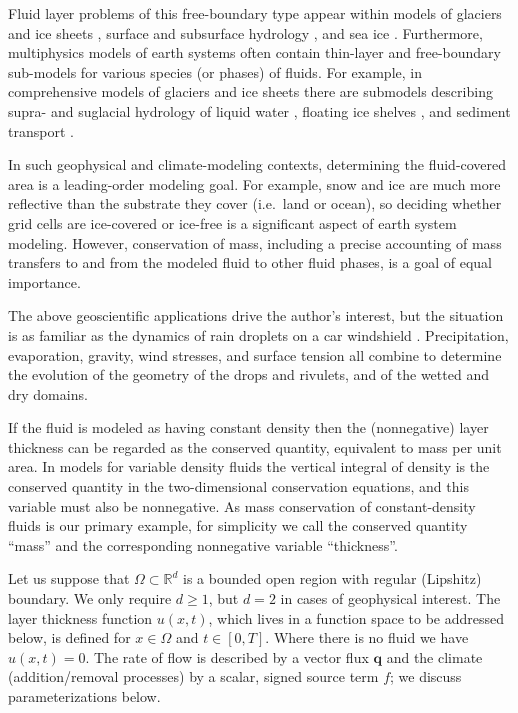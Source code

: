\documentclass[final,onefignum]{siamart190516}
\newcommand\bq{\mathbf{q}}
\newcommand\RR{\mathbb{R}}
\begin{document}
Fluid layer problems of this free-boundary type appear within models of glaciers and ice sheets \cite{Bueler2016,CalvoDuranyVazquez2000,Calvoetal2002,DiazSchiavi1999,EgholmNielsen2010,JouvetBueler2012},  surface and subsurface hydrology \cite{AlonsoSantillanaDawson2008,Maxwelletal2014}, and sea ice \cite{LipscombHunke2004,Thorndikeetal1975}.  Furthermore, multiphysics models of earth systems often contain thin-layer and free-boundary sub-models for various species (or phases) of fluids.  For example, in comprehensive models of glaciers and ice sheets there are submodels describing supra- and suglacial hydrology of liquid water \cite{Aschwandenetal2012,BuelervanPelt2015,Schoofetal2012}, floating ice shelves \cite{Albrechtetal2011}, and sediment transport \cite{Brinkerhoffetal2017}.

In such geophysical and climate-modeling contexts, determining the fluid-covered area is a leading-order modeling goal.  For example, snow and ice are much more reflective than the substrate they cover (i.e.~land or ocean), so deciding whether grid cells are ice-covered or ice-free is a significant aspect of earth system modeling.  However, conservation of mass, including a precise accounting of mass transfers to and from the modeled fluid to other fluid phases, is a goal of equal importance.

The above geoscientific applications drive the author's interest, but the situation is as familiar as the dynamics of rain droplets on a car windshield \cite{Kondic2003}.  Precipitation, evaporation, gravity, wind stresses, and surface tension all combine to determine the evolution of the geometry of the drops and rivulets, and of the wetted and dry domains.

If the fluid is modeled as having constant density then the (nonnegative) layer thickness can be regarded as the conserved quantity, equivalent to mass per unit area.  In models for variable density fluids the vertical integral of density is the conserved quantity in the two-dimensional conservation equations, and this variable must also be nonnegative.  As mass conservation of constant-density fluids is our primary example, for simplicity we call the conserved quantity ``mass'' and the corresponding nonnegative variable ``thickness''.

Let us suppose that $\Omega \subset \RR^d$ is a bounded open region with regular (Lipshitz) boundary.  We only require $d\ge 1$, but $d=2$ in cases of geophysical interest.  The layer thickness function $u(x,t)$, which lives in a function space to be addressed below, is defined for $x\in \Omega$ and $t \in [0,T]$.  Where there is no fluid we have $u(x,t)=0$.  The rate of flow is described by a vector flux $\bq$ and the climate (addition/removal processes) by a scalar, signed source term $f$; we discuss parameterizations below.
\end{document}
